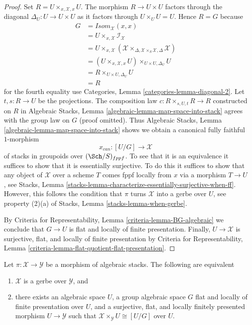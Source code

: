 \begin{proof}
Set $R = U \times_{x, \mathcal{X}, x} U$. The morphism $R \to U \times U$
factors through the diagonal $\Delta_U : U \to U \times U$ as it factors
through $U \times_U U = U$. Hence $R = G$ because
\begin{align*}
G & = \mathit{Isom}_\mathcal{X}(x, x) \\
& = U \times_{x, \mathcal{X}} \mathcal{I}_\mathcal{X} \\
& = U \times_{x, \mathcal{X}}
(\mathcal{X}
\times_{\Delta, \mathcal{X} \times_S \mathcal{X}, \Delta}
\mathcal{X}) \\
& = (U \times_{x, \mathcal{X}, x} U) \times_{U \times U, \Delta_U} U \\
& = R \times_{U \times U, \Delta_U} U \\
& = R
\end{align*}
for the fourth equality use
Categories, Lemma \ref{categories-lemma-diagonal-2}.
Let $t, s : R \to U$ be the projections.
The composition law $c : R \times_{s, U, t} R \to R$ constructed on $R$ in
Algebraic Stacks, Lemma \ref{algebraic-lemma-map-space-into-stack}
agrees with the group law on $G$ (proof omitted). Thus
Algebraic Stacks, Lemma \ref{algebraic-lemma-map-space-into-stack}
shows we obtain a canonical fully faithful $1$-morphism
$$
x_{can} : [U/G] \longrightarrow \mathcal{X}
$$
of stacks in groupoids over $(\Sch/S)_{fppf}$. To see that it is
an equivalence it suffices to show that it is essentially surjective.
To do this it suffices to show that any object of $\mathcal{X}$ over
a scheme $T$ comes fppf locally from $x$ via a morphism $T \to U$, see
Stacks, Lemma \ref{stacks-lemma-characterize-essentially-surjective-when-ff}.
However, this follows the condition that $\pi$ turns $\mathcal{X}$
into a gerbe over $U$, see property (2)(a) of
Stacks, Lemma \ref{stacks-lemma-when-gerbe}.

\medskip\noindent
By
Criteria for Representability, Lemma \ref{criteria-lemma-BG-algebraic}
we conclude that $G \to U$ is flat and locally of finite presentation.
Finally, $U \to \mathcal{X}$ is surjective, flat, and locally of finite
presentation by
Criteria for Representability, Lemma
\ref{criteria-lemma-flat-quotient-flat-presentation}.
\end{proof}

\begin{lemma}
\label{lemma-local-structure-gerbe}
Let $\pi : \mathcal{X} \to \mathcal{Y}$ be a morphism of algebraic stacks.
The following are equivalent
\begin{enumerate}
\item $\mathcal{X}$ is a gerbe over $\mathcal{Y}$, and
\item there exists an algebraic space $U$, a group algebraic space $G$
flat and locally of finite presentation over $U$, and a
surjective, flat, and locally finitely presented
morphism $U \to \mathcal{Y}$ such that
$\mathcal{X} \times_\mathcal{Y} U \cong [U/G]$ over $U$.
\end{enumerate}
\end{lemma}

